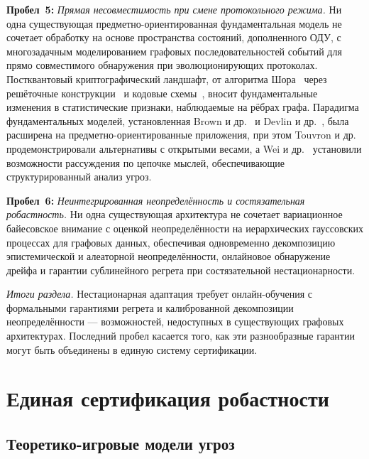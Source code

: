 \medskip
\noindent\textbf{Пробел~5:} \emph{Прямая несовместимость при смене протокольного режима.} Ни одна существующая предметно-ориентированная фундаментальная модель не сочетает обработку на основе пространства состояний, дополненного ОДУ, с многозадачным моделированием графовых последовательностей событий для прямо совместимого обнаружения при эволюционирующих протоколах. Постквантовый криптографический ландшафт, от алгоритма Шора~\cite{Shor1997} через решёточные конструкции~\cite{Ducas2018,Proos2003} и кодовые схемы~\cite{McEliece1978}, вносит фундаментальные изменения в статистические признаки, наблюдаемые на рёбрах графа. Парадигма фундаментальных моделей, установленная Brown и др.~\cite{Brown2020} и Devlin и др.~\cite{Devlin2019}, была расширена на предметно-ориентированные приложения, при этом Touvron и др.~\cite{Touvron2023} продемонстрировали альтернативы с открытыми весами, а Wei и др.~\cite{Wei2022cot} установили возможности рассуждения по цепочке мыслей, обеспечивающие структурированный анализ угроз.

\medskip
\noindent\textbf{Пробел~6:} \emph{Неинтегрированная неопределённость и состязательная робастность.} Ни одна существующая архитектура не сочетает вариационное байесовское внимание с оценкой неопределённости на иерархических гауссовских процессах для графовых данных, обеспечивая одновременно декомпозицию эпистемической и алеаторной неопределённости, онлайновое обнаружение дрейфа и гарантии сублинейного регрета при состязательной нестационарности.

\medskip
\noindent\textit{Итоги раздела.} Нестационарная адаптация требует онлайн-обучения с формальными гарантиями регрета и калиброванной декомпозиции неопределённости --- возможностей, недоступных в существующих графовых архитектурах. Последний пробел касается того, как эти разнообразные гарантии могут быть объединены в единую систему сертификации.


\section{Единая сертификация робастности}
\label{sec:certification}

\subsection{Теоретико-игровые модели угроз}

